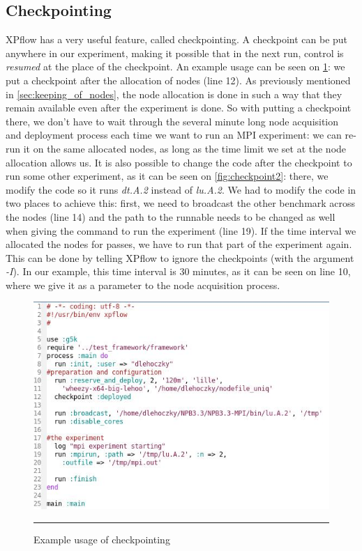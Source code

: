 \subsection{Checkpointing}
\label{sec:checkpointing}
XPflow has a very useful feature, called checkpointing. A checkpoint
can be put anywhere in our experiment, making it possible that in the
next run, control is \emph{resumed} at the place of the checkpoint. An
example usage can be seen on \ref{fig:checkpoint1}: we put a
checkpoint after the allocation of nodes (line 12). As previously
mentioned in \ref{sec:keeping_of_nodes}, the node allocation is done
in such a way that they remain available even after the experiment is
done. So with putting a checkpoint there, we don't have to wait
through the several minute long node acquisition and deployment
process each time we want to run an MPI experiment: we can re-run it
on the same allocated nodes, as long as the time limit we set at the
node allocation allows us. It is also possible to change the code
after the checkpoint to run some other experiment, as it can be seen
on \ref{fig:checkpoint2}: there, we modify the code so it runs
\emph{dt.A.2} instead of \emph{lu.A.2}. We had to modify the code in
two places to achieve this: first, we need to broadcast the other
benchmark across the nodes (line 14) and the path to the runnable
needs to be changed as well when giving the command to run the
experiment (line 19). If the time interval we allocated the nodes for
passes, we have to run that part of the experiment again. This can be
done by telling XPflow to ignore the checkpoints (with the argument
\emph{-I}). In our example, this time interval is 30 minutes, as it
can be seen on line 10, where we give it as a parameter to the node
acquisition process.
\begin{figure}[htbp]
  \centering
    \includegraphics[scale=0.7]{./Figures/checkpoint1.jpg}
    \rule{35em}{0.5pt}
  \caption[Checkpoint example]{Example usage of checkpointing}
  \label{fig:checkpoint1}
\end{figure}
